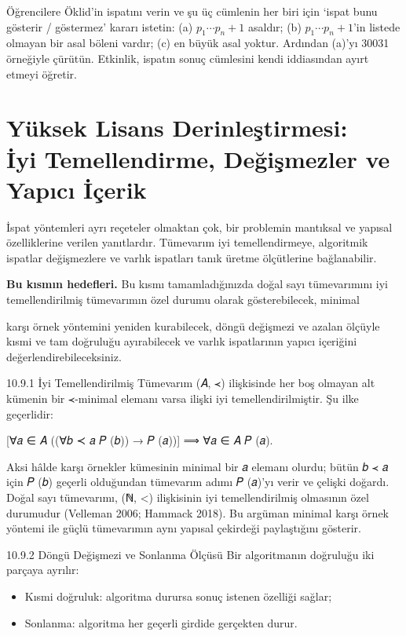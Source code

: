 \begin{sinif}
Öğrencilere Öklid’in ispatını verin ve şu üç cümlenin her biri için ‘ispat bunu gösterir / göstermez’ kararı istetin: (a) $p_1\cdots p_n+1$ asaldır; (b) $p_1\cdots p_n+1$’in listede olmayan bir asal böleni vardır; (c) en büyük asal yoktur. Ardından (a)’yı 30031 örneğiyle çürütün. Etkinlik, ispatın sonuç cümlesini kendi iddiasından ayırt etmeyi öğretir.
\end{sinif}

\section[Yüksek Lisans Derinleştirmesi: İyi Temellendirme, Değişmezler ve Yapıcı İçerik]{Yüksek Lisans Derinleştirmesi:\\ İyi Temellendirme, Değişmezler ve Yapıcı İçerik}

İspat yöntemleri ayrı reçeteler olmaktan çok, bir problemin mantıksal ve yapısal özelliklerine verilen yanıtlardır. Tümevarım iyi temellendirmeye, algoritmik ispatlar değişmezlere ve varlık ispatları tanık üretme ölçütlerine bağlanabilir.

\textbf{Bu kısmın hedefleri.} Bu kısmı tamamladığınızda doğal sayı tümevarımını iyi temellendirilmiş tümevarımın özel durumu olarak gösterebilecek, minimal


karşı örnek yöntemini yeniden kurabilecek, döngü değişmezi ve azalan ölçüyle kısmi ve tam doğruluğu ayırabilecek ve varlık ispatlarının yapıcı içeriğini değerlendirebileceksiniz.

10.9.1 İyi Temellendirilmiş Tümevarım (𝐴, ≺) ilişkisinde her boş olmayan alt kümenin bir ≺-minimal elemanı varsa ilişki iyi temellendirilmiştir. Şu ilke geçerlidir:

[∀𝑎 ∈ 𝐴 ((∀𝑏 ≺ 𝑎 𝑃 (𝑏)) → 𝑃 (𝑎))] ⟹ ∀𝑎 ∈ 𝐴 𝑃 (𝑎).

Aksi hâlde karşı örnekler kümesinin minimal bir 𝑎 elemanı olurdu; bütün 𝑏 ≺ 𝑎 için 𝑃 (𝑏) geçerli olduğundan tümevarım adımı 𝑃 (𝑎)’yı verir ve çelişki doğardı. Doğal sayı tümevarımı, (ℕ, <) ilişkisinin iyi temellendirilmiş olmasının özel durumudur (Velleman 2006; Hammack 2018). Bu argüman minimal karşı örnek yöntemi ile güçlü tümevarımın aynı yapısal çekirdeği paylaştığını gösterir.

10.9.2 Döngü Değişmezi ve Sonlanma Ölçüsü Bir algoritmanın doğruluğu iki parçaya ayrılır:

\begin{itemize}\setlength{\itemsep}{2pt}\setlength{\parskip}{0pt}
\item Kısmi doğruluk: algoritma durursa sonuç istenen özelliği sağlar;
\item Sonlanma: algoritma her geçerli girdide gerçekten durur.
\end{itemize}

